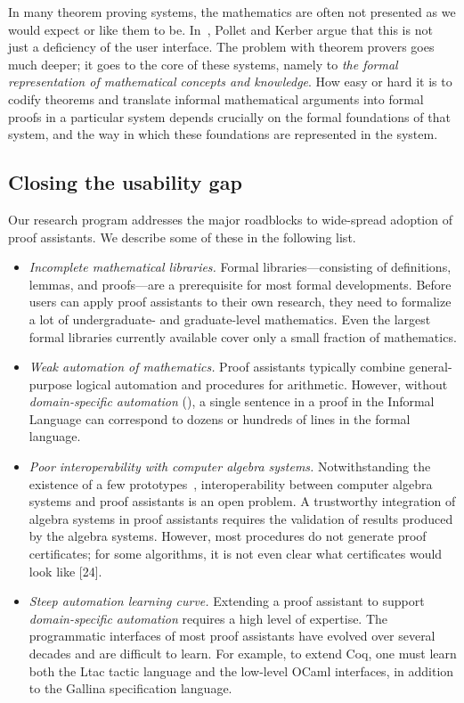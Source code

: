 \documentclass[11pt]{amsart}  %
\begin{document}
In many theorem proving systems, the mathematics are often not presented as we would expect or like them to be. In~\cite{PolletKerber:2007}, Pollet and Kerber argue that this is not just a deficiency of the user interface. The problem with theorem provers goes much deeper; it goes to the core of these systems, namely to \emph{the formal representation of mathematical concepts and knowledge}. How easy or hard it is to codify theorems and translate informal mathematical arguments into formal proofs in a particular system depends crucially on the 
formal foundations of that system, and the way in which these foundations are represented in the system.

\subsection{Closing the usability gap}
Our research program addresses the major roadblocks to wide-spread adoption of proof assistants.  We describe some of these in the following list.

\begin{itemize}
\item \emph{Incomplete mathematical libraries.} Formal libraries---consisting of  definitions, lemmas, and proofs---are a prerequisite for most formal developments. Before users can apply proof assistants to their own research, they need to formalize a lot of undergraduate- and graduate-level mathematics. Even the largest formal libraries currently available cover only a small fraction of mathematics.

\item \emph{Weak automation of mathematics.} Proof assistants typically combine general-purpose logical automation and procedures for arithmetic. However, without \textsl{domain-specific automation} (\dsa), a single sentence in a proof in the Informal Language can correspond to dozens or hundreds of lines in the formal language.

\item \emph{Poor interoperability with computer algebra systems.} Notwithstanding the existence of a few prototypes~\cite{MR1730396,MR1656868}, interoperability between computer algebra systems and proof assistants is an open problem. A trustworthy integration of algebra systems in proof assistants requires the validation of results produced by the algebra systems. However, most procedures do not generate proof certificates; for some algorithms, it is not even clear what certificates would look
  like [24]. 

\item \emph{Steep automation learning curve.}  Extending a proof
  assistant to support \textsl{domain-specific automation} requires a high level
  of expertise. The programmatic interfaces of most proof assistants have
  evolved over several decades and are difficult to learn. For example,
  to extend Coq, one must learn both the Ltac tactic language and the
  low-level OCaml interfaces, in addition to the Gallina specification language.
\end{itemize}
\end{document}
